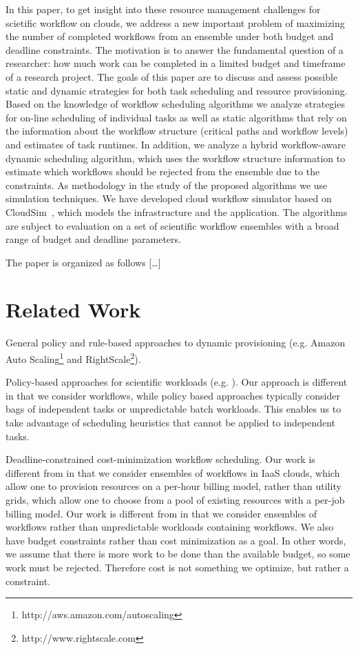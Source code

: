 \documentclass{sig-alternate}
\begin{document}
In this paper, to get insight into these resource management challenges for
scietific workflow on clouds, we address a new important problem of maximizing
the number of completed workflows from an ensemble under both budget and
deadline constraints. The motivation is to answer the fundamental question of a
researcher: how much work can be completed in a limited budget and timeframe of
a research project. The goals of this paper are to discuss and assess possible
static and dynamic strategies for both task scheduling and resource
provisioning. Based on the knowledge of workflow scheduling algorithms we
analyze strategies for on-line scheduling of individual tasks as well as static
algorithms that rely on the information about the workflow structure (critical
paths and workflow levels) and estimates of task runtimes. In addition, we
analyze a hybrid workflow-aware dynamic scheduling algorithm, which uses the
workflow structure information to estimate which workflows should be rejected
from the ensemble due to the constraints. As methodology in the study of the
proposed algorithms we use simulation techniques. We have developed cloud workflow simulator based on
CloudSim~\cite{Calheiros11}, which models the infrastructure and the application. The
algorithms are subject to evaluation on a set of scientific workflow ensembles with a broad range of
budget and deadline parameters. 

The paper is organized as follows [\ldots]

\section{Related Work}
General policy and rule-based approaches to dynamic provisioning (e.g. Amazon Auto Scaling\footnote{http://aws.amazon.com/autoscaling} and RightScale\footnote{http://www.rightscale.com}).

Policy-based approaches for scientific workloads (e.g. \cite{Marshall2010, Kim2011}). Our approach is different in that we consider workflows, while policy based approaches typically consider bags of independent tasks or unpredictable batch workloads. This enables us to take advantage of scheduling heuristics that cannot be applied to independent tasks.

Deadline-constrained cost-minimization workflow scheduling. Our work is different from \cite{Yu2005, Abrishami2010} in that we consider ensembles of workflows in IaaS clouds, which allow one to provision resources on a per-hour billing model, rather than utility grids, which allow one to choose from a pool of existing resources with a per-job billing model. Our work is different from \cite{Mao2011} in that we consider ensembles of workflows rather than unpredictable workloads containing workflows. We also have budget constraints rather than cost minimization as a goal. In other words, we assume that there is more work to be done than the available budget, so some work must be rejected. Therefore cost is not something we optimize, but rather a constraint.
\end{document}
